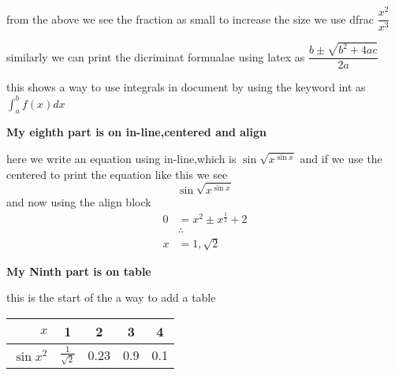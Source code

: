 \documentclass{article}
\begin{document}
    \noindent from the above we see the fraction as small to
    increase the size we use dfrac $\dfrac{x^2}{x^3}$

    \noindent similarly we can print the dicriminat formualae using
    latex as $\dfrac{b\pm\sqrt{b^2+4ac}}{2a}$
 
    \noindent this shows a way to use integrals in document by
    using the keyword int as $\int_a^bf(x)dx$
    
    \noindent \textbf{My eighth part is on in-line,centered and
    align}


    \noindent here we write an equation using in-line,which is
    $\sin{\sqrt{x^{\sin{x}}}}$ and if we use the centered to print
    the equation like this we see $$\sin{\sqrt{x^{\sin{x}}}}$$ and
    now using the align block 
    \begin{align*}
        0&= x^2\pm x^{\frac{1}{2}}+2 \\
         & \therefore \\
        x&= 1,\sqrt{2} 
    \end{align*}

    \noindent \textbf{My Ninth part is on table}

    \noindent this is the start of the a way to add a table
    \begin{center}
        \begin{tabular}{r|cccc}
            $x$ &1 &2 &3 &4 \\
            \hline
            $\sin{x^2}$&$\frac{1}{\sqrt{2}}$&0.23&0.9&0.1 
        \end{tabular}
    \end{center} 
\end{document}

